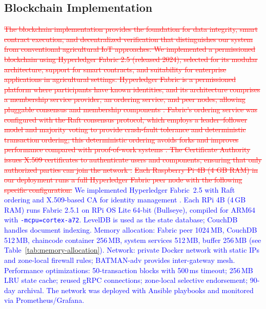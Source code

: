 \documentclass[pdflatex,sn-mathphys-num]{sn-jnl}
\theoremstyle{thmstyleone}
\theoremstyle{thmstyletwo}
\theoremstyle{thmstylethree}
\begin{document}
{\subsection{Blockchain Implementation}
\label{subsec:blockchain}

\textcolor{red}{\sout{The blockchain implementation provides the foundation for data integrity, smart contract execution, and decentralized verification that distinguishes our system from conventional agricultural IoT approaches. We implemented a permissioned blockchain using Hyperledger Fabric 2.5 (released 2024), selected for its modular architecture, support for smart contracts, and suitability for enterprise applications in agricultural settings. Hyperledger Fabric is a permissioned platform where participants have known identities, and its architecture comprises a membership service provider, an ordering service, and peer nodes, allowing pluggable consensus and membership components . Fabric's ordering service was configured with the Raft consensus protocol, which employs a leader–follower model and majority voting to provide crash-fault tolerance and deterministic transaction ordering; this deterministic ordering avoids forks and improves performance compared with proof-of-work systems . The Certificate Authority issues X.509 certificates to authenticate users and components, ensuring that only authorized parties can join the network .}}
\textcolor{red}{\sout{Each Raspberry Pi 4B (4 GB RAM) in our deployment runs a full Hyperledger Fabric peer node with the following specific configuration:}}
\textcolor{blue}{We implemented Hyperledger Fabric~2.5 \cite{ibmFabric, orderingServiceDoc} with Raft ordering and X.509-based CA for identity management \cite{orderingServiceDoc}. Each RPi 4B (4\,GB RAM) runs Fabric 2.5.1 on RPi OS Lite 64-bit (Bullseye), compiled for ARM64 with \texttt{-mcpu=cortex-a72}. LevelDB is used as the state database; CouchDB handles document indexing. Memory allocation: Fabric peer 1024\,MB, CouchDB 512\,MB, chaincode container 256\,MB, system services 512\,MB, buffer 256\,MB (see Table~\ref{tab:memory-allocation}). Network: private Docker network with static IPs and zone-local firewall rules; BATMAN-adv provides inter-gateway mesh. Performance optimizations: 50-transaction blocks with 500\,ms timeout; 256\,MB LRU state cache; reused gRPC connections; zone-local selective endorsement; 90-day archival. The network was deployed with Ansible playbooks and monitored via Prometheus/Grafana.}

}
\end{document}
